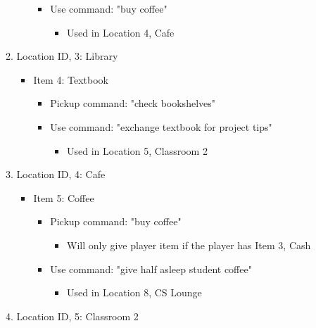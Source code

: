 \documentclass[11pt]{article}
\begin{document}
\begin{enumerate}
\begin{enumerate}
\begin{itemize}
\begin{itemize}
\begin{itemize}
                                                \end{itemize}
                                                \item Use command: "buy coffee"
                                                \begin{itemize}
                                                    \item Used in Location 4, Cafe
                                                \end{itemize}
        \end{itemize}
    \end{itemize}
    \item  Location ID, 3: Library
    \begin{itemize}
        \item Item 4: Textbook
        \begin{itemize}
            \item Pickup command: "check bookshelves"
            \item Use command: "exchange textbook for project tips"
            \begin{itemize}
                \item Used in Location 5, Classroom 2
            \end{itemize}
        \end{itemize}
    \end{itemize}
    \item Location ID, 4: Cafe
    \begin{itemize}
        \item Item 5: Coffee
        \begin{itemize}
            \item Pickup command: "buy coffee"
            \begin{itemize}
                \item Will only give player item if the player has Item 3, Cash
            \end{itemize}
            \item Use command: "give half asleep student coffee"
            \begin{itemize}
                \item Used in Location 8, CS Lounge
            \end{itemize}
        \end{itemize}
    \end{itemize}
    \item Location ID, 5: Classroom 2

\end{enumerate}
\end{enumerate}
\end{document}
